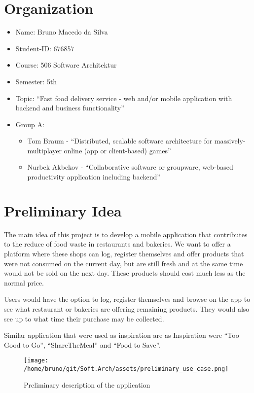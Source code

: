 \documentclass[pdftex, a4paper]{scrartcl}
\begin{document}
\section{Organization}

\begin{itemize}
    \item Name: Bruno Macedo da Silva
    \item Student-ID: 676857
    \item Course: 506 Software Architektur 
    \item Semester: 5th
    \item Topic: ``Fast food delivery service - web and/or mobile application with backend and business functionality''
    \item Group A: 
        \begin{itemize}
            \item Tom Braum - ``Distributed, scalable software architecture for massively-multiplayer online (app or 
            client-based) games''
            \item Nurbek Akbekov - ``Collaborative software or groupware, web-based productivity
            application including backend''
        \end{itemize}
\end{itemize}

\section{Preliminary Idea}

The main idea of this project is to develop a mobile application that contributes to the reduce of food waste 
in restaurants and bakeries. We want to offer a platform where these shops can log, register themselves and offer
products that were not consumed on the current day, but are still fresh and at the same time would not be sold on 
the next day. These products should cost much less as the normal price.

Users would have the option to log, register themselves and browse on the app to see what restaurant or bakeries
are offering remaining products. They would also see up to what time their purchase may be collected.

Similar application that were used as inspiration are as Inspiration were ``Too Good to Go'', ``ShareTheMeal'' 
and ``Food to Save''.

\begin{figure}[htb]
    \centering
    \texttt{[image: /home/bruno/git/Soft.Arch/assets/preliminary\_use\_case.png]}
    \caption{Preliminary description of the application}
    \label{fig:predes}
\end{figure}
\end{document}
